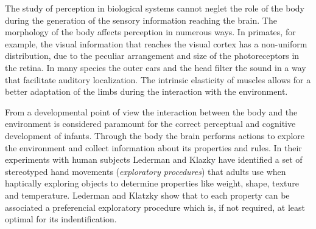
The study of perception in biological systems cannot neglet the role of the body during the generation of the sensory information reaching the brain.
The morphology of the body affects perception in numerous ways. In primates, for example, the visual information that reaches the visual cortex has a non-uniform distribution, due to the peculiar arrangement and size of the photoreceptors in the retina. In many species the outer ears and the head filter the sound in a way that facilitate auditory localization. The intrinsic elasticity of muscles allows for a better adaptation of the limbs during the interaction with the environment.

From a developmental point of view the interaction between the body and the environment is considered paramount for the correct perceptual and cognitive development of infants. 
Through the body the brain performs actions to explore the environment and collect information about its properties and rules. In their experiments with human subjects Lederman and Klazky \cite{lederman87hand} have identified a set of stereotyped hand movements ({\it exploratory procedures}) that adults use when haptically exploring objects to determine properties like weight, shape, texture and temperature. Lederman and Klatzky show that to each property can be associated a preferencial exploratory procedure which is, if not required, at least optimal for its indentification. 

